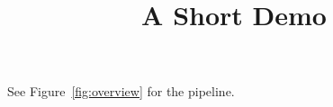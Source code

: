 \documentclass[article]{jss}
\title{A Short Demo}
\begin{document}
See Figure~\ref{fig:overview} for the pipeline.
\end{document}
